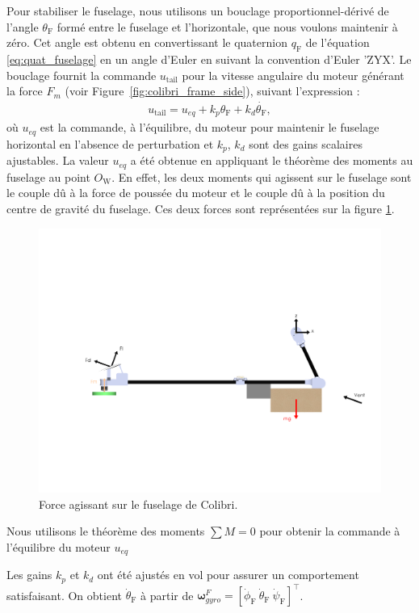 Pour stabiliser le fuselage, nous utilisons un bouclage proportionnel-dérivé de l'angle $\theta_{\text{F}}$ formé entre le fuselage et l'horizontale, que nous voulons maintenir à zéro. Cet angle est obtenu en convertissant le quaternion $q_{\text{F}}$ de l'équation \eqref{eq:quat_fuselage} en un angle d'Euler en suivant la convention d'Euler 'ZYX'. Le bouclage fournit la commande $u_{\text{tail}}$ pour la vitesse angulaire du moteur générant la force $F_{m}$ (voir Figure~\ref{fig:colibri_frame_side}), suivant l'expression :
\begin{align*}
    u_{\text{tail}} = u_{eq} + k_{p} \theta_{\text{F}} + k_{d} \dot{\theta_{\text{F}}},
\end{align*}
où $u_{eq}$ est la commande, à l'équilibre, du moteur pour maintenir le fuselage horizontal en l'absence de perturbation et $k_{p}$, $k_{d}$ sont des gains scalaires ajustables. La valeur $u_{eq}$ a été obtenue en appliquant le théorème des moments au fuselage au point $O_{\text{W}}$. En effet, les deux moments qui agissent sur le fuselage sont le couple dû à la force de poussée du moteur et le couple dû à la position du centre de gravité du fuselage. Ces deux forces sont représentées sur la figure \ref{fig:colibri_fus_force}. 
\begin{figure}[ht!]
    \centering
    \includegraphics[trim={0 15cm 0 25cm},clip, width=0.6\columnwidth]{figures/colibriMoment.png}
    \caption{Force agissant sur le fuselage de Colibri.}
    \label{fig:colibri_fus_force}
\end{figure}
Nous utilisons le théorème des moments $\sum M = 0$ pour obtenir la commande à l'équilibre du moteur $u_{eq}$

Les gains $k_{p}$ et $k_{d}$ ont été ajustés en vol pour assurer un comportement satisfaisant. On obtient $\dot{\theta}_{\text{F}}$ à partir de $\boldsymbol{\omega}_{gyro}^{F} = [\dot{\phi}_{\text{F}}~\dot{\theta}_{\text{F}}~\dot{\psi}_{\text{F}}]^\top$.



